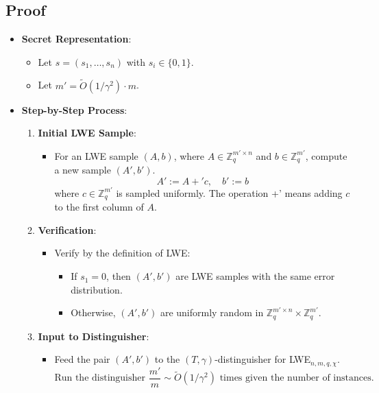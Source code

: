 \documentclass{article}
\begin{document}
    \subsection*{Proof}
    \begin{itemize}
        \item \textbf{Secret Representation}:
        \begin{itemize}
            \item Let \( s = (s_1, \ldots, s_n) \) with \( s_i \in \{0, 1\} \).
            \item Let \( m' = \tilde{O}(1/\gamma^2) \cdot m \).
        \end{itemize}

        \item \textbf{Step-by-Step Process}:
        \begin{enumerate}
            \item \textbf{Initial LWE Sample}:
            \begin{itemize}
                \item For an LWE sample \( (A, b) \), where \( A \in \mathbb{Z}_q^{m' \times n} \) and \( b \in \mathbb{Z}_q^{m'} \), compute a new sample \( (A', b') \).
                \[
                A' := A + 'c, \quad b' := b
                \]
                where \( c \in \mathbb{Z}_q^{m'} \) is sampled uniformly. The operation +' means adding \( c \) to the first column of \( A \).
            \end{itemize}

            \item \textbf{Verification}:
            \begin{itemize}
                \item Verify by the definition of LWE:
                \begin{itemize}
                    \item If \( s_1 = 0 \), then \( (A', b') \) are LWE samples with the same error distribution.
                    \item Otherwise, \( (A', b') \) are uniformly random in \( \mathbb{Z}_q^{m' \times n} \times \mathbb{Z}_q^{m'} \).
                \end{itemize}
            \end{itemize}

            \item \textbf{Input to Distinguisher}:
            \begin{itemize}
                \item Feed the pair \( (A', b') \) to the \((T, \gamma)\)-distinguisher for LWE\(_{n,m,q,\chi}\).
                \[
                \text{Run the distinguisher } \frac{m'}{m} \sim \tilde{O}(1/\gamma^2) \text{ times given the number of instances.}
                \]
            \end{itemize}


\end{enumerate}
\end{itemize}
\end{document}
